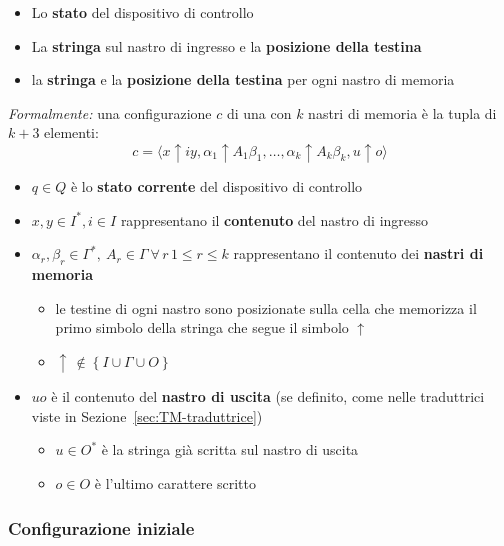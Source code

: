 \documentclass[italian, 10pt]{article}
\begin{document}
\begin{itemize}
  \item Lo \textbf{stato} del dispositivo di controllo
  \item La \textbf{stringa} sul nastro di ingresso e la \textbf{posizione della testina}
  \item la \textbf{stringa} e la \textbf{posizione della testina} per ogni nastro di memoria
\end{itemize}

\bigskip
\textit{Formalmente:} una configurazione \(c\) di una \TM con \(k\) nastri di memoria è la tupla di \(k+3\) elementi:
\[ c = \langle x \uparrow iy, \alpha_1 \uparrow A_1 \beta_1, \ldots, \alpha_k \uparrow A_k \beta_k, u \uparrow o \rangle \]

\begin{itemize}
  \item \(q \in Q\) è lo \textbf{stato corrente} del dispositivo di controllo
  \item \(x, y \in I^\ast, i \in I\) rappresentano il \textbf{contenuto} del nastro di ingresso
  \item \(\alpha_r, \beta_r \in \Gamma^\ast, \ A_r \in \Gamma \  \forall \, r \, 1 \leq r \leq k\) rappresentano il contenuto dei \textbf{nastri di memoria}
        \begin{itemize}
          \item le testine di ogni nastro sono posizionate sulla cella che memorizza il primo simbolo della stringa che segue il simbolo \(\uparrow\)
          \item \(\uparrow \, \notin \left\{ I \cup \Gamma \cup O \right\}\)
        \end{itemize}
  \item \(uo\) è il contenuto del \textbf{nastro di uscita} (se definito, come nelle \TM traduttrici viste in Sezione~\ref{sec:TM-traduttrice})
        \begin{itemize}
          \item \(u \in O^\ast\) è la stringa già scritta sul nastro di uscita
          \item \(o \in O\) è l'ultimo carattere scritto
        \end{itemize}
\end{itemize}

\subsubsection{Configurazione iniziale}
\end{document}
